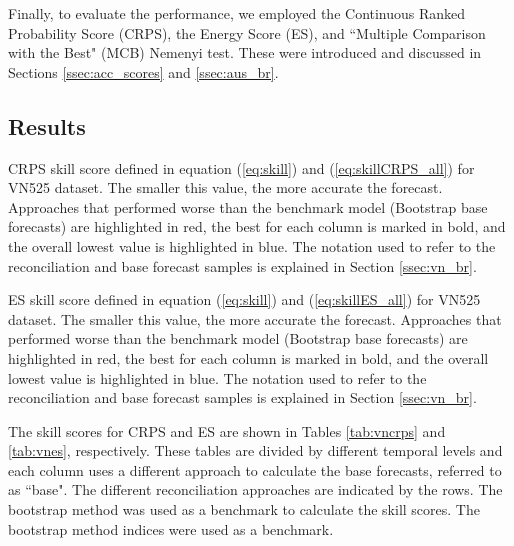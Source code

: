 \documentclass[a4paper,11pt]{article}
\theoremstyle{definition}
\begin{document}
Finally, to evaluate the performance, we employed the Continuous Ranked Probability Score (CRPS), the Energy Score (ES), and “Multiple Comparison with the Best" (MCB) Nemenyi test. These were introduced and discussed in Sections \ref{ssec:acc_scores} and \ref{ssec:aus_br}. %

\subsection{Results}

\begin{table}[p]
\centering
\begingroup
{}
\fontsize{9}{10}\selectfont

\endgroup
\caption{CRPS skill score defined in equation (\ref{eq:skill}) and (\ref{eq:skillCRPS_all}) for VN525 dataset. The smaller this value, the more accurate the forecast. Approaches that performed worse than the benchmark model (Bootstrap base forecasts) are highlighted in red, the best for each column is marked in bold, and the overall lowest value is highlighted in blue. The notation used to refer to the reconciliation and base forecast samples is explained in Section \ref{ssec:vn_br}.}
\label{tab:vncrps}
\end{table}

\begin{table}[p]
\centering
\begingroup
{}
\fontsize{9}{10}\selectfont

\endgroup
\caption{ES skill score defined in equation (\ref{eq:skill}) and (\ref{eq:skillES_all}) for VN525 dataset. The smaller this value, the more accurate the forecast. Approaches that performed worse than the benchmark model (Bootstrap base forecasts) are highlighted in red, the best for each column is marked in bold, and the overall lowest value is highlighted in blue. The notation used to refer to the reconciliation and base forecast samples is explained in Section \ref{ssec:vn_br}.}
\label{tab:vnes}
\end{table}

The skill scores for CRPS and ES are shown in Tables \ref{tab:vncrps} and \ref{tab:vnes}, respectively. These tables are divided by different temporal levels and each column uses a different approach to calculate the base forecasts, referred to as “base". The different reconciliation approaches are indicated by the rows. The bootstrap method was used as a benchmark to calculate the skill scores. The bootstrap method indices were used as a benchmark.
\end{document}
